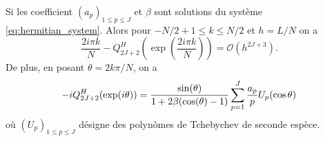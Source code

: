 \begin{proposition}
Si les coefficient $(a_p)_{1 \leq p \leq J}$ et $\beta$ sont solutions du système \eqref{eq:hermitian_system}. Alors pour $-N/2+1  \leq k \leq N/2$ et $h=L/N$ on a
\begin{equation}
\dfrac{2 i \pi k}{N} - Q_{2J+2}^H \left( \exp \left( \dfrac{2 i \pi k}{N} \right) \right) = \mathcal{O}(h^{2J+3}).
\end{equation}
De plus, en posant $\theta = 2 k \pi / N$, on a
\begin{equation}
- i Q_{2J+2}^H(\exp (i \theta) ) = \dfrac{\sin(\theta)}{1 +2 \beta (\cos (\theta) -1)} \displaystyle\sum\limits_{p=1}^J \dfrac{a_p}{p} U_p (\cos \theta ) 
\end{equation}
où $(U_p)_{1 \leq p \leq J}$ désigne des polynômes de Tchebychev de seconde espèce.
\label{prop:hermitien_polynome}
\end{proposition}

